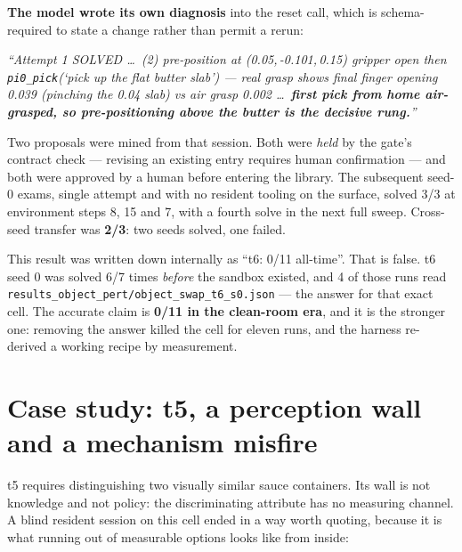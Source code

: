 \documentclass[11pt,a4paper]{article}
\newcommand{\cit}[1]{\texttt{\small #1}}
\begin{document}
\textbf{The model wrote its own diagnosis} into the reset call, which is schema-%
required to state a change rather than permit a rerun:

\begin{evidence}[title={The model's reset reason, verbatim (live log, seq 1)}]
\small\itshape
``Attempt 1 SOLVED \ldots\ (2) pre-position at (0.05,\,-0.101,\,0.15) gripper open
then \texttt{pi0\_pick}(`pick up the flat butter slab') --- real grasp shows final finger
opening 0.039 (pinching the 0.04 slab) vs air grasp 0.002 \ldots\ \textbf{first
pick from home air-grasped, so pre-positioning above the butter is the decisive
rung.}''
\end{evidence}

\noindent
Two proposals were mined from that session. Both were \emph{held} by the gate's
contract check --- revising an existing entry requires human confirmation ---
and both were approved by a human before entering the library. The subsequent
seed-0 exams, single attempt and with no resident tooling on the surface, solved
3/3 at environment steps 8, 15 and 7, with a fourth solve in the next full
sweep. Cross-seed transfer was \textbf{2/3}: two seeds solved, one failed.

\begin{caution}[title={A claim this project had to correct about itself}]
This result was written down internally as ``t6: 0/11 all-time''. That is false.
t6 seed 0 was solved 6/7 times \emph{before} the sandbox existed, and 4 of those
runs read \cit{results\_object\_pert/object\_swap\_t6\_s0.json} --- the answer
for that exact cell. The accurate claim is \textbf{0/11 in the clean-room era},
and it is the stronger one: removing the answer killed the cell for eleven runs,
and the harness re-derived a working recipe by measurement.
\end{caution}

\section{Case study: t5, a perception wall and a mechanism misfire}

t5 requires distinguishing two visually similar sauce containers. Its wall is
not knowledge and not policy: the discriminating attribute has no measuring
channel. A blind resident session on this cell ended in a way worth quoting,
because it is what running out of measurable options looks like from inside:
\end{document}
